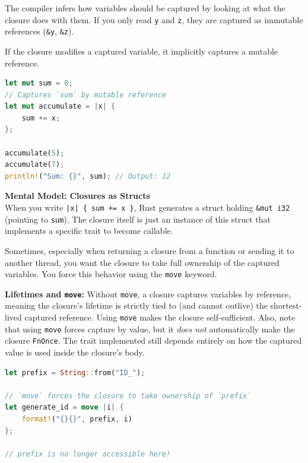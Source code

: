 \begin{notebox}
The compiler infers how variables should be captured by looking at what the closure does with them. If you only read \texttt{y} and \texttt{z}, they are captured as immutable references (\texttt{\&y}, \texttt{\&z}).
\end{notebox}

If the closure modifies a captured variable, it implicitly captures a mutable reference.

\begin{lstlisting}[language=Rust]
let mut sum = 0;
// Captures `sum` by mutable reference
let mut accumulate = |x| {
    sum += x;
};

accumulate(5);
accumulate(7);
println!("Sum: {}", sum); // Output: 12
\end{lstlisting}

\begin{insightbox}
\textbf{Mental Model: Closures as Structs} \\
When you write \texttt{|x| \{ sum += x \}}, Rust generates a struct holding \texttt{\&mut i32} (pointing to \texttt{sum}). The closure itself is just an instance of this struct that implements a specific trait to become callable.
\end{insightbox}

Sometimes, especially when returning a closure from a function or sending it to another thread, you want the closure to take full ownership of the captured variables. You force this behavior using the \texttt{move} keyword.

\begin{notebox}
\textbf{Lifetimes and \texttt{move}:} Without \texttt{move}, a closure captures variables by reference, meaning the closure's lifetime is strictly tied to (and cannot outlive) the shortest-lived captured reference. Using \texttt{move} makes the closure self-sufficient. Also, note that using \texttt{move} forces capture by value, but it \textit{does not} automatically make the closure \texttt{FnOnce}. The trait implemented still depends entirely on how the captured value is used inside the closure's body.
\end{notebox}

\begin{lstlisting}[language=Rust]
let prefix = String::from("ID_");

// `move` forces the closure to take ownership of `prefix`
let generate_id = move |i| {
    format!("{}{}", prefix, i)
};

// prefix is no longer accessible here!
\end{lstlisting}

